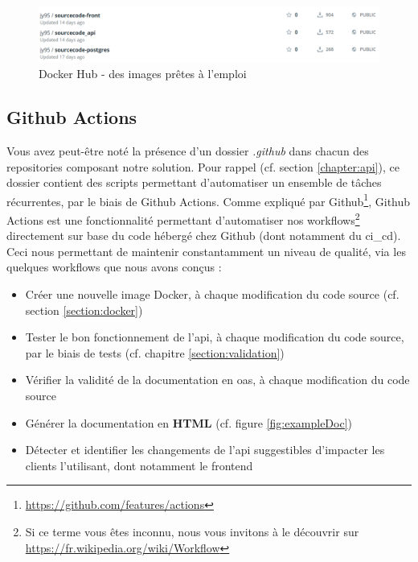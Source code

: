 \begin{figure}[H]
    \includegraphics[width=\textwidth,height=0.15\textheight,keepaspectratio]{images/serveur/dockerHub.PNG}
    \centering
    \caption{Docker Hub - des images prêtes à l'emploi}
    \label{fig:dockerImages}
\end{figure}

\pagebreak
\subsection{Github Actions}
\label{section:GithubActions}

Vous avez peut-être noté la présence d'un dossier \textit{.github} dans chacun des repositories composant notre solution.
Pour rappel (cf. section \ref{chapter:api}), ce dossier contient des scripts permettant d'automatiser un ensemble de tâches récurrentes, par le biais de Github Actions.
Comme expliqué par Github\footnote{
    \url{https://github.com/features/actions}
}, Github Actions est une fonctionnalité permettant d'automatiser nos workflows\footnote{
    Si ce terme vous êtes inconnu, nous vous invitons à le découvrir sur \url{https://fr.wikipedia.org/wiki/Workflow}
}  
directement sur base du code hébergé chez Github (dont notamment du \gls{ci_cd}).
Ceci nous permettant de maintenir constantamment un niveau de qualité, via les quelques workflows que nous avons conçus :

\begin{itemize}[nosep,noitemsep,topsep=0pt,partopsep=0pt,after=\vspace*{2pt}]
    \item Créer une nouvelle image Docker, à chaque modification du code source (cf. section \ref{section:docker})
    \item Tester le bon fonctionnement de l'\Gls{api}, à chaque modification du code source, par le biais de tests (cf. chapitre \ref{section:validation})
    \item Vérifier la validité de la documentation en \Gls{oas}, à chaque modification du code source
    \item Générer la documentation en \textbf{HTML} (cf. figure \ref{fig:exampleDoc})
    \item Détecter et identifier les changements de l'\Gls{api} suggestibles d'impacter les clients l'utilisant, dont notamment le \gls{frontend}
\end{itemize}


